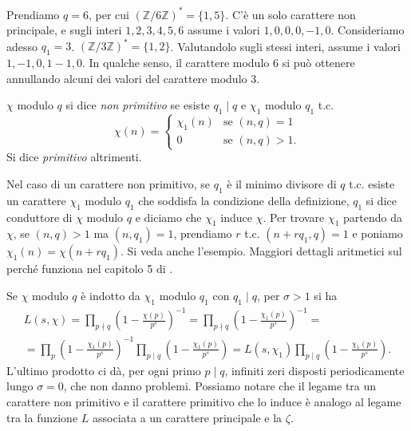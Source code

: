 \begin{ex}
  Prendiamo $q=6$, per cui $(\mathbb{Z}/6 \mathbb{Z})^*=\{1,5\}$. C'è un solo carattere non principale, e sugli interi $1,2,3,4,5,6$ assume i valori $1,0,0,0,-1,0$. Consideriamo adesso $q_1=3$. $(\mathbb{Z}/3 \mathbb{Z})^*=\{1,2\}$.
  Valutandolo sugli stessi interi, assume i valori $1,-1,0,1-1,0$. In qualche senso, il carattere modulo $6$ si può ottenere annullando alcuni dei valori del carattere modulo $3$.
\end{ex}

\begin{defn}
  $\chi$ modulo $q$ si dice \textit{non primitivo} se esiste $q_1 \mid q$ e $\chi_1$ modulo $q_1$ t.c.
  $$\chi(n)=\begin{cases}
    \chi_1(n) &\mbox{se }(n,q)=1 \\
    0 &\mbox{se }(n,q)>1.
\end{cases}$$
Si dice \textit{primitivo} altrimenti.
\end{defn}

Nel caso di un carattere non primitivo, se $q_1$ è il minimo divisore di $q$ t.c. esiste un carattere $\chi_1$ modulo $q_1$ che soddisfa la condizione della definizione, $q_1$ si dice conduttore di $\chi$ modulo $q$ e diciamo che $\chi_1$ induce $\chi$. Per trovare $\chi_1$ partendo da $\chi$, se $(n,q)>1$ ma $(n,q_1)=1$, prendiamo $r$ t.c. $(n+rq_1,q)=1$ e poniamo $\chi_1(n)=\chi(n+rq_1)$. Si veda anche l'esempio. Maggiori dettagli aritmetici sul perché funziona nel capitolo 5 di \cite{D}.

\begin{oss}
  Se $\chi$ modulo $q$ è indotto da $\chi_1$ modulo $q_1$ con $q_1 \mid q$, per $\sigma>1$ si ha
  \begin{gather*}
    L(s,\chi)=\prod_{p\nmid q} \left(1-\frac{\chi(p)}{p^s}\right)^{-1}=\prod_{p\nmid q}\left(1-\frac{\chi_1(p)}{p^s}\right)^{-1}=\\
    =\prod_p \left(1-\frac{\chi_1(p)}{p^s}\right)^{-1}\prod_{p\mid q} \left(1-\frac{\chi_1(p)}{p^s}\right)=L(s,\chi_1)\prod_{p\mid q} \left(1-\frac{\chi_1(p)}{p^s}\right).
  \end{gather*}
  L'ultimo prodotto ci dà, per ogni primo $p \mid q$, infiniti zeri disposti periodicamente lungo $\sigma=0$, che non danno problemi. Possiamo notare che il legame tra un carattere non primitivo e il carattere primitivo che lo induce è analogo al legame tra la funzione $L$ associata a un carattere principale e la $\zeta$.
\end{oss}

